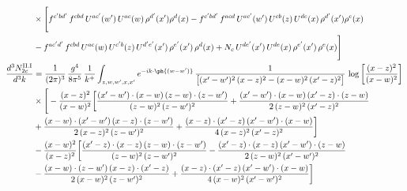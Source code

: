 \begin{align}
&\times\Bigg[f^{c^{\prime}bd^{\prime}}\,f^{cbd}\, U^{ac^{\prime}}(w^{\prime})\,U^{ac}(w)\,\rho^{d^{\prime}}(x^{\prime})\rho^{d}(x)- f^{c^{\prime}bd^{\prime}}\,f^{acd}\,U^{ac^{\prime}}(w^{\prime})\,U^{cb}(z)\,U^{de}(x)\,\rho^{d^{\prime}}(x^{\prime})\rho^{e}(x) \notag \\ & -f^{ac^{\prime}d^{\prime}}\,f^{cbd}\,U^{ac}(w)\,U^{c^{\prime}b}(z)\,U^{d^{\prime}e^{\prime}}(x^{\prime})\,\rho^{e^{\prime}}(x^{\prime})\,\rho^{d}(x) +N_{c}\,U^{de^{\prime}}(x^{\prime})\,U^{de}(x)\,\rho^{e^{\prime}}(x^{\prime})\,\rho^{e}(x)\Bigg]\\
\frac{d^{3}N^{\rm II.I}_{2c}}{d^{3}k} &= \frac{1}{(2\pi)^{3}}\,\frac{g^{4}}{8\pi^{5}}\,\frac{1}{k^{+}}\int_{z,w,w^{\prime},x,x^{\prime}}e^{-ik\cdot\ph{(w-w^{\prime})}}\,\frac{1}{\big[(x^{\prime}-w^{\prime})^{2}\,(x-z)^{2}-(x-w)^{2}\,(x^{\prime}-z)^{2}\big]}\,\log\left[\frac{(x-z)^{2}}{(x-w)^{2}}\right]\notag\\
&\times\Bigg[-\frac{(x-z)^{2}}{(x-w)^{2}}\bigg[\frac{(x^{\prime}-w^{\prime})\cdot(x-w)\,(z-w)\cdot(z-w^{\prime})}{(z-w)^{2}\,(z-w^{\prime})^{2}}+\frac{(x^{\prime}-w^{\prime})\cdot(x-w)\,(x^{\prime}-z)\cdot(z-w)}{2\,(z-w)^{2}\,(x^{\prime}-z)^{2}}\notag \\ & +\frac{(x-w)\cdot(x^{\prime}-w^{\prime})\,(x-z)\cdot(z-w^{\prime})}{2\,(x-z)^{2}\,(z-w^{\prime})^{2}}+\frac{(x-z)\cdot(x^{\prime}-z)\,(x^{\prime}-w^{\prime})\cdot(x-w)}{4\,(x-z)^{2}\,(x^{\prime}-z)^{2}}\bigg]\notag\\
&-\frac{(x-w)^{2}}{(x-z)^{2}}\bigg[\frac{(x^{\prime}-z)\cdot(x-z)\,(z-w)\cdot(z-w^{\prime})}{(z-w)^{2}\,(z-w^{\prime})^{2}}-\frac{(x^{\prime}-z)\cdot(x-z)\,(x^{\prime}-w^{\prime})\cdot(z-w)}{2\,(z-w)^{2}\,(x^{\prime}-w^{\prime})^{2}}\notag \\ & -\frac{(x-w)\cdot(z-w^{\prime})\,(x-z)\cdot(x^{\prime}-z)}{2\,(x-w)^{2}\,(z-w^{\prime})^{2}}+\frac{(x-z)\cdot(x^{\prime}-z)\,(x^{\prime}-w^{\prime})\cdot(x-w)}{4\,(x-w)^{2}\,(x^{\prime}-w^{\prime})^{2}}\bigg]\notag\\

\end{align}
